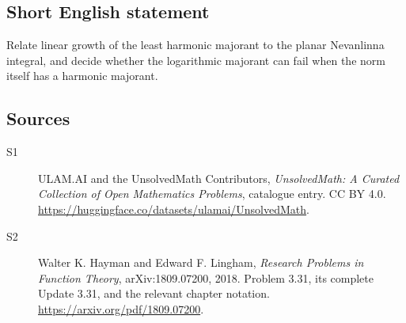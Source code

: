 \documentclass[11pt]{book}
\begin{document}
\subsection{Short English statement}
Relate linear growth of the least harmonic majorant to the planar Nevanlinna integral, and decide whether the logarithmic majorant can fail when the norm itself has a harmonic majorant.
\subsection{Sources}
\begin{description}
\item[\hypertarget{source:statement:1}{S1}] ULAM.AI and the UnsolvedMath Contributors, \emph{UnsolvedMath: A Curated Collection of Open Mathematics Problems}, catalogue entry. CC BY 4.0. \url{https://huggingface.co/datasets/ulamai/UnsolvedMath}.
\item[\hypertarget{source:statement:2}{S2}] Walter K. Hayman and Edward F. Lingham, \emph{Research Problems in Function Theory}, arXiv:1809.07200, 2018. Problem 3.31, its complete Update 3.31, and the relevant chapter notation. \url{https://arxiv.org/pdf/1809.07200}.
\end{description}
\label{end:statement}
\end{document}
